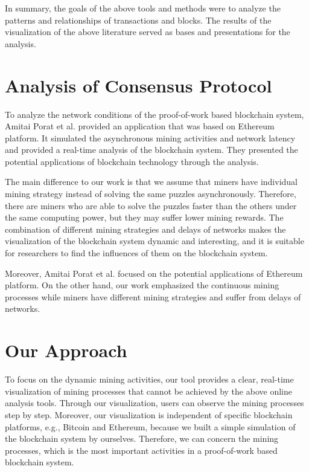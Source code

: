In summary, the goals of the above tools and methods were to analyze the patterns and relationships of transactions and blocks. The results of the visualization of the above literature served as bases and presentations for the analysis. 

\section{Analysis of Consensus Protocol}

To analyze the network conditions of the proof-of-work based blockchain system, Amitai Porat et al. \cite{Porat} provided an application that was based on Ethereum platform. It simulated the asynchronous mining activities and network latency and provided a real-time analysis of the blockchain system. They presented the potential applications of blockchain technology through the analysis.

The main difference to our work is that we assume that miners have individual mining strategy instead of solving the same puzzles asynchronously. Therefore, there are miners who are able to solve the puzzles faster than the others under the same computing power, but they may suffer lower mining rewards. The combination of different mining strategies and delays of networks makes the visualization of the blockchain system dynamic and interesting, and it is suitable for researchers to find the influences of them on the blockchain system. 

Moreover, Amitai Porat et al. focused on the potential applications of Ethereum platform. On the other hand, our work emphasized the continuous mining processes while miners have different mining strategies and suffer from delays of networks. 

\section{Our Approach}

To focus on the dynamic mining activities, our tool provides a clear, real-time visualization of mining processes that cannot be achieved by the above online analysis tools. Through our visualization, users can observe the mining processes step by step. Moreover, our visualization is independent of specific blockchain platforms, e.g., Bitcoin and Ethereum, because we built a simple simulation of the blockchain system by ourselves. Therefore, we can concern the mining processes, which is the most important activities in a proof-of-work based blockchain system.

